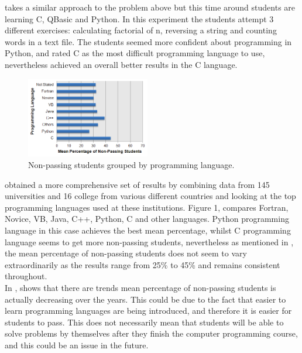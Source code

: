 \documentclass[a4paper]{article}
\begin{document}
\textcite{KrpanBilobrk2011} takes a similar approach to the problem above but this time around students are learning C, QBasic and Python. In this experiment the students attempt 3 different exercises: calculating factorial of n, reversing a string and counting words in a text file. The students seemed more confident about programming in Python, and rated C as the most difficult programming language to use, nevertheless achieved an overall better results in the C language.\\

\begin{figure}
	\vspace{-20pt}
	\begin{center}
		\includegraphics[width=0.48\textwidth]{NonPassingStudents}
	\end{center}
	\caption{Non-passing students grouped by programming language. \parencite{WatsonLi2014}}
	\vspace{-10pt}
\end{figure}

\textcite{WatsonLi2014} obtained a more comprehensive set of results by combining data from 145 universities and 16 college from various different countries and looking at the top programming languages used at these institutions. Figure 1, compares Fortran, Novice, VB, Java, C++, Python, C and other languages. Python programming language in this case achieves the best mean percentage, whilst C programming language seems to get more non-passing students, nevertheless as mentioned in \textcite{WatsonLi2014}, the mean percentage of non-passing students does not seem to vary extraordinarily as the results range from 25\% to 45\% and remains consistent throughout.\\

In \textcite{WatsonLi2014}, shows that there are trends mean percentage of non-passing students is actually decreasing over the years. This could be due to the fact that easier to learn programming languages are being introduced, and therefore it is easier for students to pass. This does not necessarily mean that students will be able to solve problems by themselves after they finish the computer programming course, and this could be an issue in the future.\\
\end{document}
